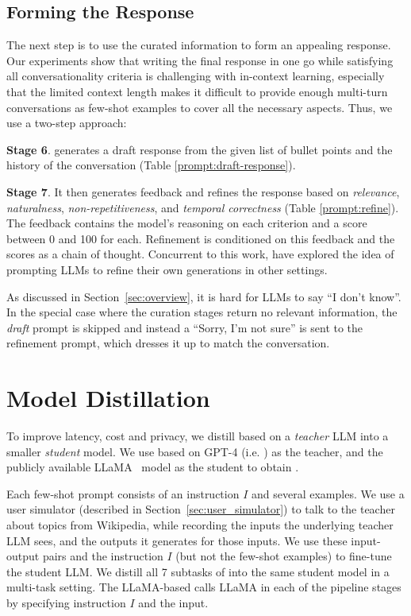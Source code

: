 \subsection{Forming the Response}
The next step is to use the curated information to form an appealing response. Our experiments show that writing the final response in one go while satisfying all conversationality criteria is challenging with in-context learning, especially that the limited context length makes it difficult to provide enough multi-turn conversations as few-shot examples to cover all the necessary aspects. Thus, we use a two-step approach:

{\bf Stage 6}. \system generates a draft response from the given list of bullet points and the history of the conversation (Table \ref{prompt:draft-response}).

{\bf Stage 7}. It then generates feedback and refines the response based on\label{sec:feedback_and_refine}
{\em relevance}, {\em naturalness}, {\em non-repetitiveness}, and {\em temporal correctness} (Table \ref{prompt:refine}). 
The feedback contains the model's reasoning on each criterion and a score between 0 and 100 for each. Refinement is conditioned on this feedback and the scores as a chain of thought.
Concurrent to this work, \citet{madaan2023selfrefine} have explored the idea of prompting LLMs to refine their own generations in other settings.

As discussed in Section~\ref{sec:overview}, 
it is hard for LLMs to say ``I don't know''. In the special case where the curation stages return no relevant information, the \emph{draft} prompt is skipped and instead a ``Sorry, I'm not sure'' is sent to the refinement prompt, which dresses it up to match the conversation.


\section{Model Distillation}
To improve latency, cost and privacy, we distill \system based on a \emph{teacher} LLM into a smaller \emph{student} model.
We use \system based on GPT-4 (i.e. \systemgf) as the teacher, and the publicly available LLaMA~\cite{touvron2023llama} model as the student to obtain \systeml.

Each few-shot prompt consists of an instruction $I$  and several examples. 
We use a user simulator (described in Section~\ref{sec:user_simulator}) to talk to the teacher \system about topics from Wikipedia, while recording the inputs the underlying teacher LLM sees, and the outputs it generates for those inputs. We use these input-output pairs and the instruction $I$ (but not the few-shot examples) to fine-tune the student LLM.
We distill all 7 subtasks of \system into the same student model in a multi-task setting.
The LLaMA-based \system calls LLaMA in each of the pipeline stages by specifying instruction $I$ and the input.

